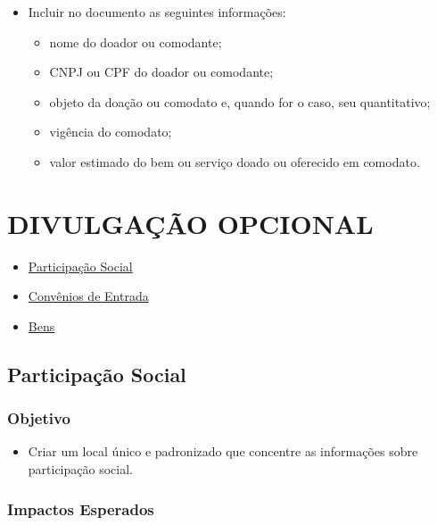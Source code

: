 \documentclass[
]{book}
\providecommand{\tightlist}{%
  \setlength{\itemsep}{0pt}\setlength{\parskip}{0pt}}
\begin{document}
\begin{itemize}
\tightlist
\item
  Incluir no documento as seguintes informações:

  \begin{itemize}
  \tightlist
  \item
    nome do doador ou comodante;
  \item
    CNPJ ou CPF do doador ou comodante;
  \item
    objeto da doação ou comodato e, quando for o caso, seu quantitativo;
  \item
    vigência do comodato;
  \item
    valor estimado do bem ou serviço doado ou oferecido em comodato.
  \end{itemize}
\end{itemize}

\hypertarget{divulgauxe7uxe3o-opcional}{%
\chapter{DIVULGAÇÃO OPCIONAL}\label{divulgauxe7uxe3o-opcional}}

\begin{itemize}
\tightlist
\item
  \href{participacao-social.html}{Participação Social}
\item
  \href{convenios-entrada.html}{Convênios de Entrada}
\item
  \href{bens.html}{Bens}
\end{itemize}

\hypertarget{participauxe7uxe3o-social}{%
\section{Participação Social}\label{participauxe7uxe3o-social}}

\hypertarget{objetivo-12}{%
\subsection{Objetivo}\label{objetivo-12}}

\begin{itemize}
\tightlist
\item
  Criar um local único e padronizado que concentre as informações sobre participação social.
\end{itemize}

\hypertarget{impactos-esperados-13}{%
\subsection{Impactos Esperados}\label{impactos-esperados-13}}
\end{document}
